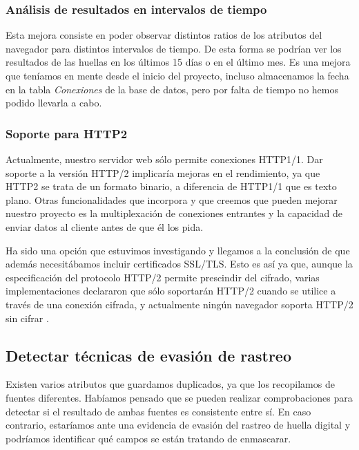 \subsubsection{Análisis de resultados en intervalos de tiempo}
Esta mejora consiste en poder observar distintos ratios de los atributos del navegador para distintos intervalos de tiempo. De esta forma se podrían ver los resultados de las huellas en los últimos 15 días o en el último mes. Es una mejora que teníamos en mente desde el inicio del proyecto, incluso almacenamos la fecha en la tabla \textit{Conexiones} de la base de datos, pero por falta de tiempo no hemos podido llevarla a cabo.
\subsubsection{Soporte para HTTP2}
Actualmente, nuestro servidor web sólo permite conexiones HTTP1/1. Dar soporte a la versión HTTP/2 implicaría mejoras en el rendimiento, ya que HTTP2 se trata de un formato binario, a diferencia de HTTP1/1 que es texto plano. Otras funcionalidades que incorpora y que creemos que pueden mejorar nuestro proyecto es la multiplexación de conexiones entrantes y la capacidad de enviar datos al cliente antes de que él los pida. \par
Ha sido una opción que estuvimos investigando y llegamos a la conclusión de que además necesitábamos incluir certificados SSL/TLS. Esto es así ya que, aunque la especificación del protocolo HTTP/2 permite prescindir del cifrado, varias implementaciones declararon que sólo soportarán HTTP/2 cuando se utilice a través de una conexión cifrada, y actualmente ningún navegador soporta HTTP/2 sin cifrar \cite{http2}. \par
\subsection{Detectar técnicas de evasión de rastreo}
Existen varios atributos que guardamos duplicados, ya que los recopilamos de fuentes diferentes. Habíamos pensado que se pueden realizar comprobaciones para detectar si el resultado de ambas fuentes es consistente entre sí. En caso contrario, estaríamos ante una evidencia de evasión del rastreo de huella digital y podríamos identificar qué campos se están tratando de enmascarar.
\noindent
